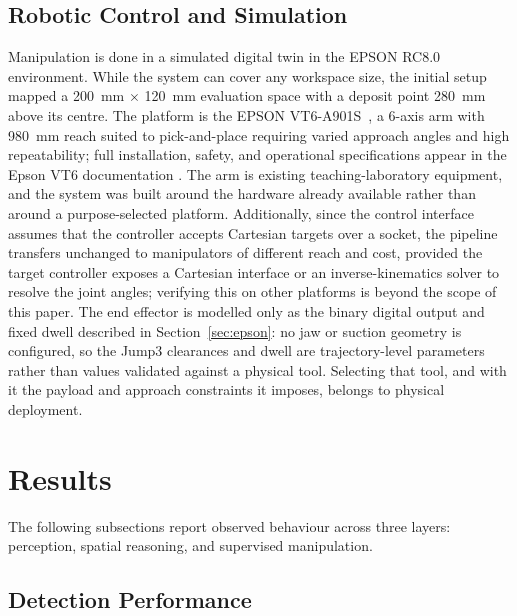 \documentclass[conference]{IEEEtran}
\begin{document}
\subsection{Robotic Control and Simulation}
Manipulation is done in a simulated digital twin in the EPSON RC8.0 environment. While the system can cover any workspace size, the initial setup mapped a 200~mm $\times$ 120~mm evaluation space with a deposit point 280~mm above its centre. The platform is the EPSON VT6-A901S~\cite{b2}, a 6-axis arm with 980~mm reach suited to pick-and-place requiring varied approach angles and high repeatability; full installation, safety, and operational specifications appear in the Epson VT6 documentation \cite{epsonvt6}. The arm is existing teaching-laboratory equipment, and the system was built around the hardware already available rather than around a purpose-selected platform. Additionally, since the control interface assumes that the controller accepts Cartesian targets over a socket, the pipeline transfers unchanged to manipulators of different reach and cost, provided the target controller exposes a Cartesian interface or an inverse-kinematics solver to resolve the joint angles; verifying this on other platforms is beyond the scope of this paper. The end effector is modelled only as the binary digital output and fixed dwell described in Section~\ref{sec:epson}: no jaw or suction geometry is configured, so the Jump3 clearances and dwell are trajectory-level parameters rather than values validated against a physical tool. Selecting that tool, and with it the payload and approach constraints it imposes, belongs to physical deployment.

\section{Results}
The following subsections report observed behaviour across three layers: perception, spatial reasoning, and supervised manipulation.

\subsection{Detection Performance}
\end{document}
